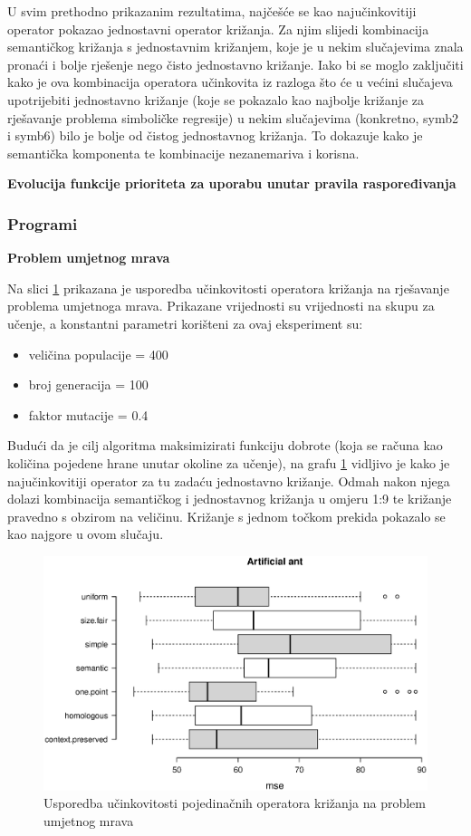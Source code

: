 U svim prethodno prikazanim rezultatima, najčešće se kao najučinkovitiji operator pokazao jednostavni operator križanja. Za njim slijedi kombinacija semantičkog križanja s jednostavnim križanjem, koje je u nekim slučajevima znala pronaći i bolje rješenje nego čisto jednostavno križanje. Iako bi se moglo zaključiti kako je ova kombinacija operatora učinkovita iz razloga što će u većini slučajeva upotrijebiti jednostavno križanje (koje se pokazalo kao najbolje križanje za rješavanje problema simboličke regresije) u nekim slučajevima (konkretno, symb2 i symb6) bilo je bolje od čistog jednostavnog križanja. To dokazuje kako je semantička komponenta te kombinacije nezanemariva i korisna.



\textbf{Evolucija funkcije prioriteta za uporabu unutar pravila raspoređivanja}



\subsubsection{Programi}
\textbf{Problem umjetnog mrava}

Na slici \ref{antbox} prikazana je usporedba učinkovitosti operatora križanja na rješavanje problema umjetnoga mrava. Prikazane vrijednosti su vrijednosti na skupu za učenje, a konstantni parametri korišteni za ovaj eksperiment su:
\begin{itemize}
\item{veličina populacije = 400}
\item{broj generacija = 100}
\item{faktor mutacije = 0.4}
\end{itemize} 

Budući da je cilj algoritma maksimizirati funkciju dobrote (koja se računa kao količina pojedene hrane unutar okoline za učenje), na grafu \ref{antbox} vidljivo je kako je najučinkovitiji operator za tu zadaću jednostavno križanje. Odmah nakon njega dolazi kombinacija semantičkog i jednostavnog križanja u omjeru 1:9 te križanje pravedno s obzirom na veličinu. Križanje s jednom točkom prekida pokazalo se kao najgore u ovom slučaju.

\begin{figure}[H]
	\centering
	\includegraphics[trim=0cm 4cm 0cm 0cm, scale=0.6]{./slike/boxPlots/ant.eps}
	\caption{Usporedba učinkovitosti pojedinačnih operatora križanja na problem umjetnog mrava}
	\label{antbox}
\end{figure}

